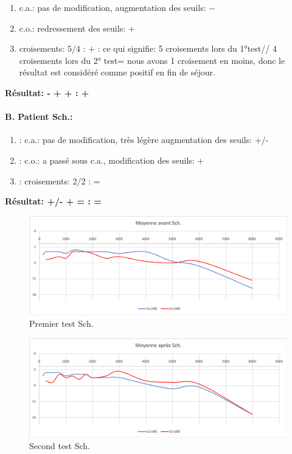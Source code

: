 	\begin{enumerate}
 		\item  c.a.: pas de modification, augmentation des
                  seuils: $-$
 		\item  c.o.: redressement des seuils: $+$
 		\item  croisements: $5/4$ : $+$ : ce qui signifie:  5 croisements lors du 1°test// 4 croisements lors du 2° test= nous avons 1 croisement en moins, donc le résultat est considéré comme positif en fin
                  de séjour.
                \end{enumerate}

                \textbf{ Résultat:  -    +    +       :  +}




\paragraph{B. Patient Sch.:}

	\begin{enumerate}

 		\item : c.a.: pas de modification, très légère augmentation des
                  seuils: +/-
 		\item : c.o.: a passé sous c.a., modification des seuils: +
 		\item : croisements: 2/2 :     =
                   \end{enumerate}
 \textbf{ Résultat:  +/-    +    =        :  =}

\begin{figure}[th]
\centering
\includegraphics[width=1\linewidth]{images/graphiques/schaff_pre.png}
\caption[Patient B. : 1° test]{Premier test Sch.}

\end{figure}


         \begin{figure}[th]
\centering
\includegraphics[width=1\linewidth]{images/graphiques/schaff_post.png}
\caption[Patient B. : 2° test]{Second test Sch.}

\label{groupecontroleimage1}
\end{figure}



